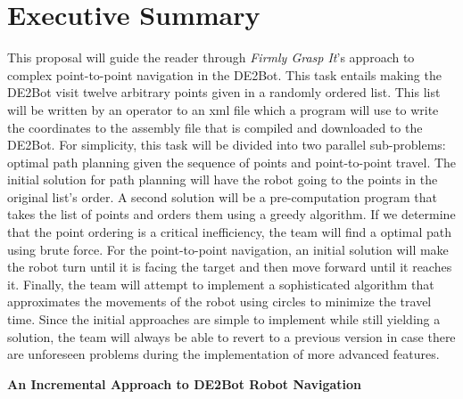 \documentclass[12pt,conference,onecolumn]{article} %
\begin{document}
\section*{Executive Summary}
This proposal will guide the reader through \emph{Firmly Grasp It}'s approach to complex point-to-point navigation in the DE2Bot. This task entails making the DE2Bot visit twelve arbitrary points given in a randomly ordered list. This list will be written by an operator to an xml file which a program will use to write the coordinates to the assembly file that is compiled and downloaded to the DE2Bot. For simplicity, this task will be divided into two parallel sub-problems: optimal path planning given the sequence of points and point-to-point travel. The initial solution for path planning will have the robot going to the points in the original list's order. A second solution will be a pre-computation program that takes the list of points and orders them using a greedy algorithm. If we determine that the point ordering is a critical inefficiency, the team will find a optimal path using brute force. For the point-to-point navigation, an initial solution will make the robot turn until it is facing the target and then move forward until it reaches it. Finally, the team will attempt to implement a sophisticated algorithm that approximates the movements of the robot using circles to minimize the travel time. Since the initial approaches are simple to implement while still yielding a solution, the team will always be able to revert to a previous version in case there are unforeseen problems during the implementation of more advanced features.


\clearpage

\begin{center}
  
   \textbf{\LARGE An Incremental Approach to DE2Bot Robot Navigation}
\end{center}
\end{document}
